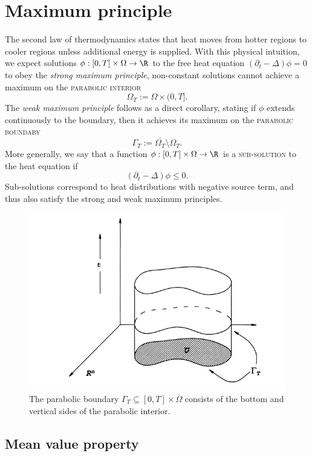 \documentclass[reqno]{amsart}
\theoremstyle{definition}
\theoremstyle{remark}
\renewcommand{\emph}{\textsc}
\begin{document}
\section{Maximum principle}

The second law of thermodynamics states that heat moves from hotter regions to cooler regions unless additional energy is supplied. With this physical intuition, we expect solutions $\phi : [0, T] \times \Omega \to \R$ to the free heat equation $(\partial_t - \Delta) \phi = 0$ to obey the \textit{strong maximum principle}, non-constant solutions cannot achieve a maximum on the \emph{parabolic interior}
	\[ \Omega_T := \Omega \times (0, T]. \]
The \textit{weak maximum principle} follows as a direct corollary, stating if $\phi$ extends continuously to the boundary, then it achieves its maximum on the \emph{parabolic boundary}
	\[ \Gamma_T := \overline{\Omega_T} \setminus \Omega_T.  \]
More generally, we say that a function $\phi: [0, T] \times \Omega \to \R$ is a \emph{sub-solution} to the heat equation if
	\[ (\partial_t - \Delta) \phi \leq 0. \]
Sub-solutions correspond to heat distributions with negative source term, and thus also satisfy the strong and weak maximum principles. 	
	
\begin{figure}[h]
	\begin{center}
		\includegraphics[scale =0.6]{parabolic}
		\caption{The parabolic boundary $\Gamma_T \subseteq [0, T] \times \overline\Omega$ consists of the bottom and vertical sides of the parabolic interior.}
	\end{center}
\end{figure}

\subsection{Mean value property}
\end{document}
